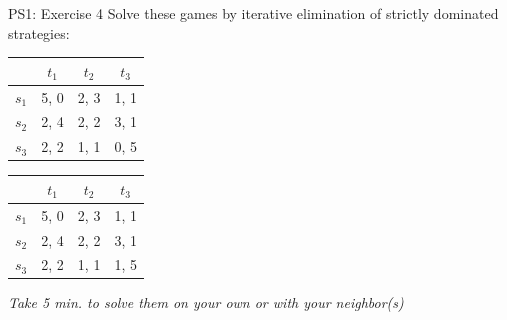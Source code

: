 \begin{frame}{PS1: Exercise 4}
Solve these games by iterative elimination of strictly dominated strategies:
\begin{multicols}{2}
\begin{table}
  \begin{tabular}{c|c|c|c}
          & $t_1$ & $t_2$ & $t_3$ \\
    \midrule
    $s_1$ & 5, 0  & 2, 3  & 1, 1 \\
    \midrule
    $s_2$ & 2, 4  & 2, 2  & 3, 1 \\
    \midrule
    $s_3$ & 2, 2  & 1, 1  & 0, 5
  \end{tabular}
\end{table}
\vfill\null \columnbreak
\begin{table}
  \begin{tabular}{c|c|c|c}
          & $t_1$ & $t_2$ & $t_3$ \\
    \midrule
    $s_1$ & 5, 0  & 2, 3  & 1, 1 \\
    \midrule
    $s_2$ & 2, 4  & 2, 2  & 3, 1 \\
    \midrule
    $s_3$ & 2, 2  & 1, 1  & 1, 5
  \end{tabular}
\end{table}
\vfill\null
\end{multicols}
\textit{Take 5 min. to solve them on your own or with your neighbor(s)}
\end{frame}

